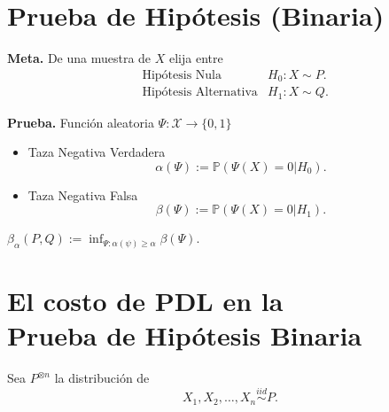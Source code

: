 \section{Prueba de Hip\'otesis (Binaria)}
\noindent\textbf{Meta.} De una muestra de $X$ elija entre
\begin{align*}
    &\text{Hip\'otesis Nula}        &H_0: X\sim P.\\
    &\text{Hip\'otesis Alternativa} &H_1:X\sim Q.
\end{align*}

\noindent\textbf{Prueba.} Funci\'on aleatoria $\Psi\colon\mathcal{X}\to\{0,1\}$
\begin{itemize}
    \item Taza Negativa Verdadera
    \begin{equation*}
        \alpha(\Psi):=\mathbb{P}(\Psi(X)=0|H_0).
    \end{equation*}
    \item Taza Negativa Falsa
    \begin{equation*}
        \beta(\Psi):=\mathbb{P}(\Psi(X)=0|H_1).
    \end{equation*}
\end{itemize}

\begin{observation}\cite{polyanskiy2014lecture}
    $\beta_\alpha(P,Q):=\displaystyle{\inf_{\Psi\colon\alpha(\psi)\geq\alpha}\beta(\Psi)}$.
\end{observation}

\section{El costo de PDL en la\\
Prueba de Hip\'otesis Binaria}
\begin{notation}\cite{polyanskiy2014lecture,asoodeh2020contraction}
    Sea $P^{\otimes n}$ la distribuci\'on de 
    \begin{equation*}
        X_1,X_2,\dots,X_n\overset{iid}{\sim}P.
    \end{equation*}
\end{notation}

